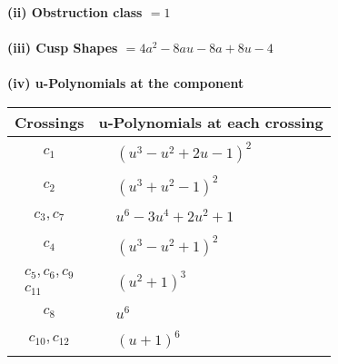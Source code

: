 \documentclass[1p]{elsarticle_modified}
\theoremstyle{definition}
\begin{document}
\flushleft \textbf{(ii) Obstruction class $= 1$}\\~\\
\flushleft \textbf{(iii) Cusp Shapes $= 4 a^2-8 a u-8 a+8 u-4$}\\~\\
\newpage\renewcommand{\arraystretch}{1}
\flushleft \textbf{(iv) u-Polynomials at the component}\newline \\
\begin{tabular}{m{50pt}|m{274pt}}
Crossings & \hspace{64pt}u-Polynomials at each crossing \\
\hline $$\begin{aligned}c_{1}\end{aligned}$$&$\begin{aligned}
&(u^3- u^2+2 u-1)^2
\end{aligned}$\\
\hline $$\begin{aligned}c_{2}\end{aligned}$$&$\begin{aligned}
&(u^3+u^2-1)^2
\end{aligned}$\\
\hline $$\begin{aligned}c_{3},c_{7}\end{aligned}$$&$\begin{aligned}
&u^6-3 u^4+2 u^2+1
\end{aligned}$\\
\hline $$\begin{aligned}c_{4}\end{aligned}$$&$\begin{aligned}
&(u^3- u^2+1)^2
\end{aligned}$\\
\hline $$\begin{aligned}c_{5},c_{6},c_{9}\\c_{11}\end{aligned}$$&$\begin{aligned}
&(u^2+1)^3
\end{aligned}$\\
\hline $$\begin{aligned}c_{8}\end{aligned}$$&$\begin{aligned}
&u^6
\end{aligned}$\\
\hline $$\begin{aligned}c_{10},c_{12}\end{aligned}$$&$\begin{aligned}
&(u+1)^6
\end{aligned}$\\
\hline
\end{tabular}\\~\\
\end{document}
